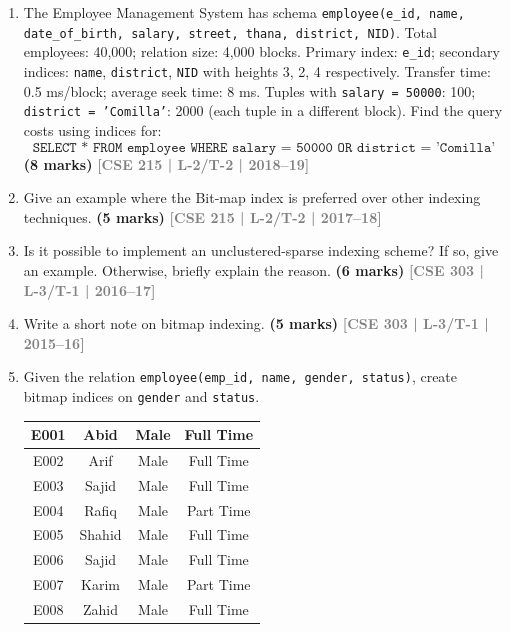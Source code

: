 \documentclass[12pt]{article}
\newcommand{\yr}[1]{\hfill\textcolor{gray}{\small\textbf{[#1]}}}
\newcommand{\mk}[1]{\textcolor{orange!70!black}{\small\textbf{(#1 marks)}}}
\begin{document}
\begin{enumerate}
\item The Employee Management System has schema \texttt{employee(e\_id, name, date\_of\_birth, salary, street, thana, district, NID)}. Total employees: 40,000; relation size: 4,000 blocks. Primary index: \texttt{e\_id}; secondary indices: \texttt{name}, \texttt{district}, \texttt{NID} with heights 3, 2, 4 respectively. Transfer time: 0.5 ms/block; average seek time: 8 ms. Tuples with \texttt{salary = 50000}: 100; \texttt{district = 'Comilla'}: 2000 (each tuple in a different block).
Find the query costs using indices for:
\[\texttt{SELECT * FROM employee WHERE salary = 50000 OR district = 'Comilla'}\]
 \mk{8} \yr{CSE 215 | L-2/T-2 | 2018--19}


\item Give an example where the Bit-map index is preferred over other indexing techniques.
\mk{5} \yr{CSE 215 | L-2/T-2 | 2017--18}


\item Is it possible to implement an unclustered-sparse indexing scheme? If so, give an example. Otherwise, briefly explain the reason.
\mk{6} \yr{CSE 303 | L-3/T-1 | 2016--17}


\item Write a short note on bitmap indexing.
\mk{5} \yr{CSE 303 | L-3/T-1 | 2015--16}


\item Given the relation \texttt{employee(emp\_id, name, gender, status)}, create bitmap indices on \texttt{gender} and \texttt{status}.
\begin{center}
  \renewcommand{\arraystretch}{1.3} %
    \begin{tabular}{|c|c|c|c|}
        \hline
        E001 & Abid   & Male & Full Time \\ \hline
        E002 & Arif   & Male & Full Time \\ \hline
        E003 & Sajid  & Male & Full Time \\ \hline
        E004 & Rafiq  & Male & Part Time \\ \hline
        E005 & Shahid & Male & Full Time \\ \hline
        E006 & Sajid  & Male & Full Time \\ \hline
        E007 & Karim  & Male & Part Time \\ \hline
        E008 & Zahid  & Male & Full Time \\ \hline
    \end{tabular}
    

\end{center}
\end{enumerate}
\end{document}
